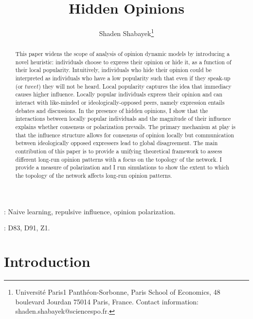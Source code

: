 \documentclass{article}
\begin{document}
\title{ Hidden Opinions }

\author{Shaden  Shabayek\footnote{Universit\'{e} Paris1 Panth\'{e}on-Sorbonne, Paris School of Economics, 48 boulevard Jourdan 75014 Paris, France. Contact information: shaden.shabayek@sciencespo.fr.}}

\maketitle

\begin{abstract}
This  paper widens the scope of analysis of opinion dynamic models by introducing a novel heuristic: individuals choose to express their opinion or hide it, as a function of their local popularity. Intuitively, individuals who hide their opinion could be interpreted as individuals who have a low popularity such that even if they speak-up (or $tweet$) they will not be heard.  Local popularity captures the idea that immediacy causes higher influence. Locally popular individuals express their opinion and can interact with like-minded or ideologically-opposed peers, namely expression entails debates and discussions.  In the presence of hidden opinions, I show that the interactions between locally popular individuals and the magnitude of their influence explains whether consensus or polarization prevails. The primary mechanism at play is that the influence structure allows for consensus of opinion locally but communication between ideologically opposed expressers lead to global disagreement. The main contribution of this paper is to provide a unifying theoretical framework to assess different long-run opinion patterns with a focus on the topology of the network.  I provide a measure of polarization and I run simulations to show the extent to which the topology of the network affects long-run opinion patterns.   
\end{abstract}
\medskip

: Naive learning, repulsive influence, opinion polarization. 

\medskip

: D83, D91, Z1. 

%
%

\onehalfspacing
\section{Introduction}
\end{document}
